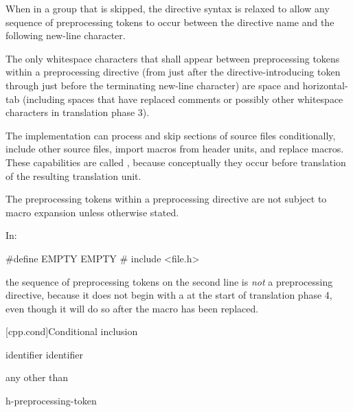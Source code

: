 \pnum
When in a group that is skipped, the directive
syntax is relaxed to allow any sequence of preprocessing tokens to occur between
the directive name and the following new-line character.

\pnum
The only whitespace characters that shall appear
between preprocessing tokens
within a preprocessing directive
(from just after the directive-introducing token
through just before the terminating new-line character)
are space and horizontal-tab
(including spaces that have replaced comments
or possibly other whitespace characters
in translation phase 3).

\pnum
The implementation can
process and skip sections of source files conditionally,
include other source files,
import macros from header units,
and replace macros.
These capabilities are called
,
because conceptually they occur
before translation of the resulting translation unit.

\pnum
The preprocessing tokens within a preprocessing directive
are not subject to macro expansion unless otherwise stated.

\begin{example}
In:
\begin{codeblock}
#define EMPTY
EMPTY   #   include <file.h>
\end{codeblock}
the sequence of preprocessing tokens on the second line is \textit{not}
a preprocessing directive, because it does not begin with a \tcode{\#} at the start of
translation phase 4, even though it will do so after the macro 
has been replaced.
\end{example}

[cpp.cond]{Conditional inclusion}%
%

%
\begin{bnf}
\br
     identifier\br
     identifier \terminal{)}
\end{bnf}

\begin{bnf}
\br
    \textnormal{any  other than \terminal{>}}
\end{bnf}

\begin{bnf}
\br
    h-preprocessing-token 
\end{bnf}

